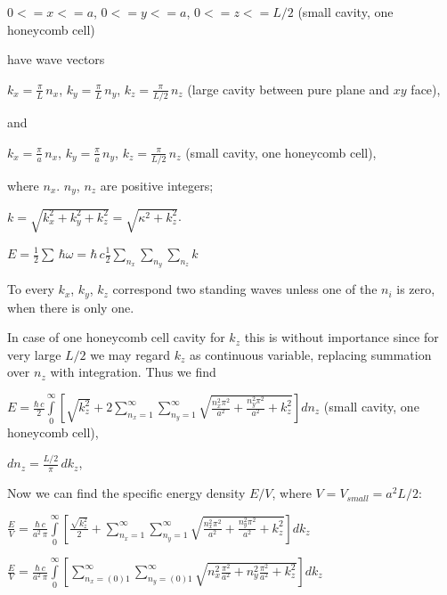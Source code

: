 \documentclass[twoside, 10pt]{article}
\begin{document}
\begin{multicols}{2}
    \(0<=x<=a\), \(0<=y<=a\), \(0<=z<=L/2\) (small cavity, one honeycomb
cell)

    have wave vectors

    \(k_x = \frac{\pi}{L}\,n_x\), \(k_y = \frac{\pi}{L}\,n_y\),
\(k_z = \frac{\pi}{L/2}\,n_z\) (large cavity between pure plane and
\(xy\) face),

    and

    \(k_x = \frac{\pi}{a}\,n_x\), \(k_y = \frac{\pi}{a}\,n_y\),
\(k_z = \frac{\pi}{L/2}\,n_z\) (small cavity, one honeycomb cell),

where \(n_x\). \(n_y\), \(n_z\) are positive integers;

    \(k = \sqrt{k_x^2+k_y^2+k_z^2} = \sqrt{\kappa^2+k_z^2}\).

    \(E = \frac{1}{2}\sum\,\hbar\omega = \hbar\,c\frac{1}{2}\sum\limits_{n_x}^{}\sum\limits_{n_y}^{}\sum\limits_{n_z}^{}k\)

    To every \(k_x\), \(k_y\), \(k_z\) correspond two standing waves unless
one of the \(n_i\) is zero, when there is only one.

    In case of one honeycomb cell cavity for \(k_z\) this is without
importance since for very large \(L/2\) we may regard \(k_z\) as
continuous variable, replacing summation over \(n_z\) with integration.
Thus we find

\noindent
\(E = \frac{\hbar\,c}{2}\int\limits_{0}^{\infty}\left[{\sqrt{k_z^2}+2\sum\limits_{n_x=1}^{\infty}\sum\limits_{n_y=1}^{\infty}\sqrt{\frac{n_x^2 \pi^2}{a^2}+\frac{n_y^2 \pi^2}{a^2}+k_z^2}}\right]d{n_z}\)
(small cavity, one honeycomb cell),

    \(dn_z = \frac{L/2}{\pi}\,dk_z\),

    Now we can find the specific energy density \(E/V\), where
\(V = V_{small} = a^2 L/2\):


\noindent
\(\frac{E}{V} = \frac{\hbar\,c}{a^2\,\pi}\int\limits_{0}^{\infty}\left[{\frac{\sqrt{k_z^2}}{2}+\sum\limits_{n_x=1}^{\infty}\sum\limits_{n_y=1}^{\infty}\sqrt{\frac{n_x^2 \pi^2}{a^2}+\frac{n_y^2 \pi^2}{a^2}+k_z^2}}\right] dk_z\)

\(\frac{E}{V} = \frac{\hbar\,c}{a^2\,\pi}\int\limits_{0}^{\infty}\left[{\sum\limits_{n_x=(0)1}^{\infty}\sum\limits_{n_y=(0)1}^{\infty}\sqrt{n_x^2\frac{\pi^2}{a^2}+n_y^2\frac{\pi^2}{a^2}+k_z^2}}\right] dk_z\)


\end{multicols}
\end{document}
